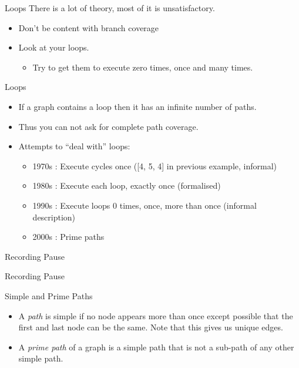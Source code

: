 \documentclass[handout]{beamer}
\newcommand{\recordingpause}{
\begin{frame}{Recording Pause}
  \begin{center}
    Recording Pause
  \end{center}
\end{frame}
}
\begin{document}
\begin{frame}{Loops}
There is a lot of theory, most of it is unsatisfactory. 
  \begin{itemize}
  \item Don't be content with branch coverage
  \item Look at your loops.
    \begin{itemize}
    \item Try to get them to execute zero times, once and many times.
    \end{itemize}
  \end{itemize}
\end{frame}
  \begin{frame}{Loops}
    \begin{itemize}
      
  \item If a graph contains a loop then it has an infinite number of
    paths.
  \item Thus you can not ask for complete path coverage. 
  \item Attempts to “deal with” loops:
    \begin{itemize}
    \item 1970s : Execute cycles once  ([4, 5, 4] in previous example, informal)
    \item 1980s : Execute each loop, exactly once (formalised)
    \item 1990s : Execute loops 0 times, once, more than once (informal description)
    \item 2000s : Prime paths
\end{itemize}
  \end{itemize}
  
\end{frame}
\recordingpause 
\begin{frame}{Simple and Prime Paths}
  \begin{itemize}
  \item A {\it path} is simple if no node appears more than once except
    possible that the first and last node can be the same. Note that this
    gives us unique edges.
  \item A {\it prime path} of a graph is a simple path that is not a
    sub-path of any other simple path.
  \end{itemize}
  
\end{frame}
\end{document}
